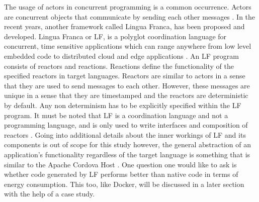 
The usage of actors in concurrent programming is a common occurrence. Actors are concurrent objects that communicate 
by sending each other messages \cite{lingua}. In the recent years, another framework called Lingua Franca, has been 
proposed and developed. Lingua Franca or LF, is a polyglot coordination language for concurrent, time sensitive applications 
which can range anywhere from low level embedded code to distributed cloud and edge applications \cite{lf-lang}. An LF 
program consists of reactors and reactions. Reactions define the functionality of the specified reactors in target 
languages. Reactors are similar to actors in a sense that they are used to send messages to each other. However, these 
messages are unique in a sense that they are timestamped and the reactors are deterministic by default. Any non determinism has to be explicitly specified within 
the LF program. It must be noted that LF is a coordination language and not a programming language, and is only 
used to write interfaces and composition of reactors \cite{lf-lang}. Going into additional details about the inner workings 
of LF and its components is out of scope for this study however, the general abstraction of an application's 
functionality regardless of the target language is something that is similar to the Apache Cordova Host \cite{cordovahost}. One question one would 
like to ask is whether code generated by LF performs better than native code in terms of energy consumption. This too, like Docker, will be discussed in a 
later section with the help of a case study.
